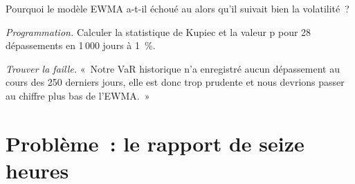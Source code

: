 \begin{exercise}[$\star\star$]\label{exo:rc:market-risk-measures:6}
Pourquoi le modèle EWMA a-t-il échoué au  alors qu'il suivait bien la volatilité~?
\end{exercise}

\begin{exercise}[$\star\star\star$]\label{exo:rc:market-risk-measures:7}
\emph{Programmation.} Calculer la statistique de Kupiec et la valeur p pour 28 dépassements en 1\,000 jours à 1~\%.
\end{exercise}

\begin{exercise}[$\star\star\star$]\label{exo:rc:market-risk-measures:8}
\emph{Trouver la faille.} «~Notre VaR historique n'a enregistré aucun dépassement au cours des 250 derniers jours, elle est donc trop
prudente et nous devrions passer au chiffre plus bas de l'EWMA.~»
\end{exercise}

\section{Problème~: le rapport de seize heures}

